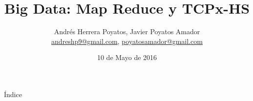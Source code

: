 \documentclass[compress]{beamer}
\title{Big Data: Map Reduce y TCPx-HS}
\author[Andrés Herrera Poyatos, Javier Poyatos Amador]{
	Andrés Herrera Poyatos, Javier Poyatos Amador \texorpdfstring{\\
		\href{mailto:andreshp9@gmail.com}{andreshp9@gmail.com}, \href{mailto:poyatosamador@gmail.com}{poyatosamador@gmail.com}
	}{}
}
\date{10 de Mayo de 2016}
\newcommand{\importsection}[1]{}           %
\begin{document}
	\begin{frame}[plain]
		\titlepage
	\end{frame}

	\importsection{Motivacion.tex}

	\begin{frame}{Índice}
		\hypertarget{index}{}
		\tableofcontents
	\end{frame}
	
	\importsection{BigData.tex}

	\importsection{MapReduce.tex}

	\importsection{TPCx-HS.tex}

	\importsection{Conclusion.tex}
	
\end{document}
